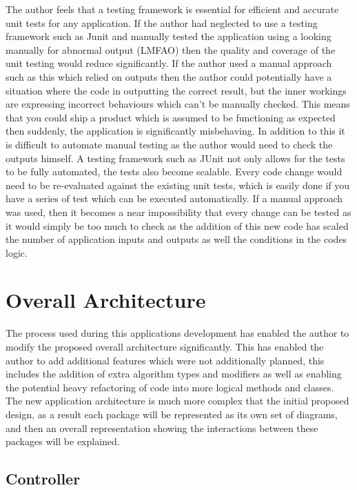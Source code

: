 The author feels that a testing framework is essential for efficient and accurate unit tests for any application. If the author had neglected to use a testing framework such as Junit and manually tested the application using a looking manually for abnormal output (LMFAO) then the quality and coverage of the unit testing would reduce significantly. If the author used a manual approach such as this which relied on outputs then the author could potentially have a situation where the code in outputting the correct result, but the inner workings are expressing incorrect behaviours which can’t be manually checked. This means that you could ship a product which is assumed to be functioning as expected then suddenly, the application is significantly misbehaving. In addition to this it is difficult to automate manual testing as the author would need to check the outputs himself. A testing framework such as JUnit not only allows for the tests to be fully automated, the tests also become scalable. Every code change would need to be re-evaluated against the existing unit tests, which is easily done if you have a series of test which can be executed automatically. If a manual approach was used, then it becomes a near impossibility that every change can be tested as it would simply be too much to check as the addition of this new code has scaled the number of application inputs and outputs as well the conditions in the codes logic.

\section{Overall Architecture}

The process used during this applications development has enabled the author to modify the proposed overall architecture significantly. This has enabled the author to add additional features which were not additionally planned, this includes the addition of extra algorithm types and modifiers as well as enabling the potential heavy refactoring of code into more logical methods and classes. The new application architecture is much more complex that the initial proposed design, as a result each package will be represented as its own set of diagrams, and then an overall representation showing the interactions between these packages will be explained.

\subsection{Controller}

